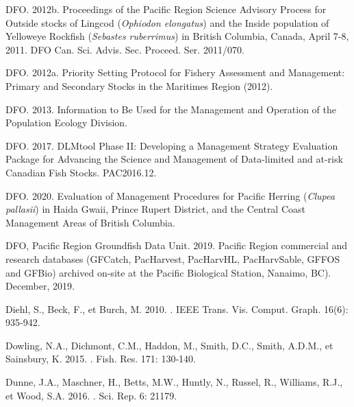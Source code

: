 \documentclass[french,11pt]{book}
\begin{document}
\begin{CSLReferences}{1}{0}
%
DFO. 2012b. Proceedings of the {Pacific} Region Science Advisory Process for Outside stocks of {Lingcod} ({\emph{Ophiodon elongatus}}) and the Inside population of {Yelloweye Rockfish} ({\emph{Sebastes ruberrimus}}) in {British Columbia, Canada, April} 7-8, 2011. DFO Can. Sci. Advis. Sec. Proceed. Ser. 2011/070.

%
DFO. 2012a. Priority {Setting Protocol} for {Fishery Assessment} and {Management}: {Primary} and {Secondary Stocks} in the {Maritimes Region} (2012).

%
DFO. 2013. Information to Be Used for the Management and Operation of the {Population Ecology Division}.

%
DFO. 2017. {DLMtool} Phase {II}: Developing a Management Strategy Evaluation Package for Advancing the Science and Management of Data-limited and at-risk {Canadian} Fish Stocks. {PAC}2016.12.

%
DFO. 2020. Evaluation of {Management} {Procedures} for {Pacific} {Herring} ({\emph{Clupea pallasii}}) in {Haida} {Gwaii}, {Prince} {Rupert} {District}, and the {Central} {Coast} {Management} {Areas} of {British} {Columbia}.

%
DFO, Pacific Region Groundfish Data Unit. 2019. {Pacific Region commercial and research databases (GFCatch, PacHarvest, PacHarvHL, PacHarvSable, GFFOS and GFBio) archived on-site at the Pacific Biological Station, Nanaimo, BC). {December}, 2019}.

%
Diehl, S., Beck, F., et Burch, M. 2010. . IEEE Trans. Vis. Comput. Graph. 16(6): 935‑942.

%
Dowling, N.A., Dichmont, C.M., Haddon, M., Smith, D.C., Smith, A.D.M., et Sainsbury, K. 2015. . Fish. Res. 171: 130‑140.

%
Dunne, J.A., Maschner, H., Betts, M.W., Huntly, N., Russel, R., Williams, R.J., et Wood, S.A. 2016. . Sci. Rep. 6: 21179.


\end{CSLReferences}
\end{document}
